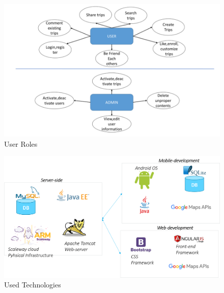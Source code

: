\begin{figure}[!htbp]
\centering
\includegraphics[width=\textwidth]{projectChapters/images/ER.png}
\caption{User Roles}
\label{fig:roles}
\end{figure}

\begin{figure}[!htbp]
\centering
\includegraphics[width=\textwidth]{projectChapters/images/usedTechnologies.png}
\caption{Used Technologies}
\label{fig:usedTechnologies}
\end{figure}


